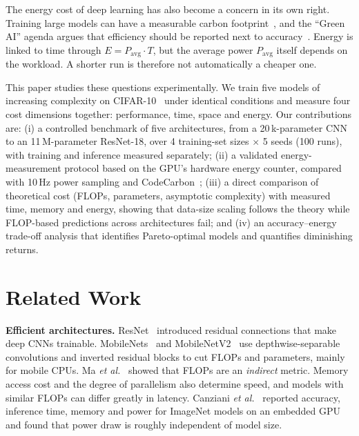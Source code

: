 \documentclass[conference]{IEEEtran}
\begin{document}
The energy cost of deep learning has also become a concern in its own right. Training large models can have a measurable carbon footprint~\cite{strubell2019energy,patterson2021carbon}, and the ``Green AI'' agenda argues that efficiency should be reported next to accuracy~\cite{schwartz2020green,henderson2020systematic}. Energy is linked to time through $E = P_{\mathrm{avg}}\cdot T$, but the average power $P_{\mathrm{avg}}$ itself depends on the workload. A shorter run is therefore not automatically a cheaper one.

This paper studies these questions experimentally. We train five models of increasing complexity on CIFAR-10~\cite{krizhevsky2009cifar} under identical conditions and measure four cost dimensions together: performance, time, space and energy. Our contributions are: (i) a controlled benchmark of five architectures, from a 20\,k-parameter CNN to an 11\,M-parameter ResNet-18, over 4 training-set sizes $\times$ 5 seeds (100 runs), with training and inference measured separately; (ii) a validated energy-measurement protocol based on the GPU's hardware energy counter, compared with 10\,Hz power sampling and CodeCarbon~\cite{codecarbon}; (iii) a direct comparison of theoretical cost (FLOPs, parameters, asymptotic complexity) with measured time, memory and energy, showing that data-size scaling follows the theory while FLOP-based predictions across architectures fail; and (iv) an accuracy--energy trade-off analysis that identifies Pareto-optimal models and quantifies diminishing returns.

\section{Related Work}
\textbf{Efficient architectures.} ResNet~\cite{he2016resnet} introduced residual connections that make deep CNNs trainable. MobileNets~\cite{howard2017mobilenets} and MobileNetV2~\cite{sandler2018mobilenetv2} use depthwise-separable convolutions and inverted residual blocks to cut FLOPs and parameters, mainly for mobile CPUs. Ma \emph{et al.}~\cite{ma2018shufflenetv2} showed that FLOPs are an \emph{indirect} metric. Memory access cost and the degree of parallelism also determine speed, and models with similar FLOPs can differ greatly in latency. Canziani \emph{et al.}~\cite{canziani2016analysis} reported accuracy, inference time, memory and power for ImageNet models on an embedded GPU and found that power draw is roughly independent of model size.
\end{document}
